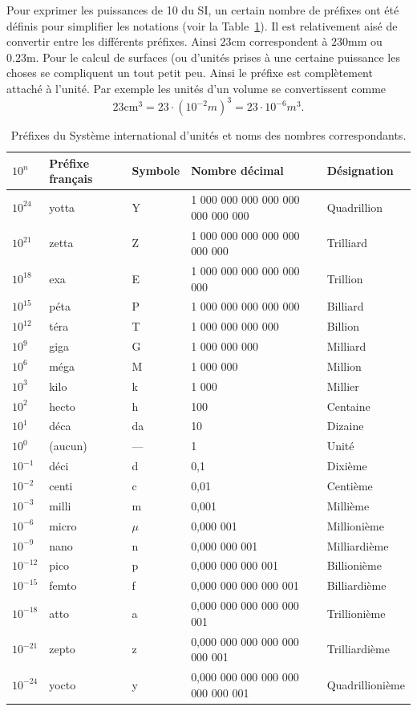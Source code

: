 \documentclass[a4paper,12pt]{book}
\newcommand{\cm}{\mathrm{cm}}
\newcommand{\mm}{\mathrm{mm}}
\newcommand{\m}{\mathrm{m}}
\begin{document}
Pour exprimer les puissances de 10 du SI, un certain nombre de préfixes ont été définis pour simplifier 
les notations (voir la Table~\ref{table_prefixe}). Il est relativement aisé de convertir entre les différents préfixes.
Ainsi $23\cm$ correspondent à $230\mm$ ou $0.23\m$. Pour le calcul de surfaces (ou d'unités prises à une certaine puissance les choses
se compliquent un tout petit peu. Ainsi le préfixe est complètement attaché à l'unité. Par exemple les unités d'un volume
se convertissent comme
\begin{equation}
 23\cm^3=23\cdot(10^{-2} m)^3=23\cdot 10^{-6}m^3.
\end{equation}

\begin{table}
\begin{tabular}{|l|l|l|l|l|}
\hline
$10^n$&Préfixe français&Symbole&Nombre décimal&Désignation\\
\hline\hline
$10^{24}$&yotta&Y&1 000 000 000 000 000 000 000 000&Quadrillion\\
\hline
$10^{21}$&zetta&Z&1 000 000 000 000 000 000 000&Trilliard\\
\hline
$10^{18}$&exa&E&1 000 000 000 000 000 000&Trillion\\
\hline
$10^{15}$&péta&P&1 000 000 000 000 000&Billiard\\
\hline
$10^{12}$&téra&T&1 000 000 000 000&Billion\\
\hline
$10^{9}$&giga&G&1 000 000 000&Milliard\\
\hline
$10^{6}$&méga&M&1 000 000&Million\\
\hline
$10^{3}$&kilo&k&1 000&Millier\\
\hline
$10^{2}$&hecto&h&100&Centaine\\
\hline
$10^{1}$&déca&da&10&Dizaine\\
\hline
$10^{0}$&(aucun)&—&1&Unité\\
\hline
$10^{-1}$&déci&d&0,1&Dixième\\
\hline
$10^{-2}$&centi&c&0,01&Centième\\
\hline
$10^{-3}$&milli&m&0,001&Millième\\
\hline
$10^{-6}$&micro&$\mu$&0,000 001&Millionième\\
\hline
$10^{-9}$&nano&n&0,000 000 001&Milliardième\\
\hline
$10^{-12}$&pico&p&0,000 000 000 001&Billionième\\
\hline
$10^{-15}$&femto&f&0,000 000 000 000 001&Billiardième\\
\hline
$10^{-18}$&atto&a&0,000 000 000 000 000 001&Trillionième\\
\hline
$10^{-21}$&zepto&z&0,000 000 000 000 000 000 001&Trilliardième\\
\hline
$10^{-24}$&yocto&y&0,000 000 000 000 000 000 000 001&Quadrillionième\\
\hline
\end{tabular}
\caption{Préfixes du Système international d'unités et noms des nombres correspondants.}
\label{table_prefixe}
\end{table}
\end{document}
